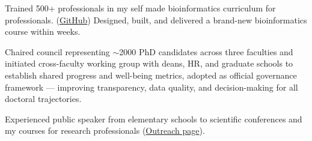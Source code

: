 \documentclass[a4paper,10pt]{article}
\begin{document}
{\begin{adjustbox}{valign=t}
\begin{minipage}[t]{0.6\textwidth}
\begin{description}
  \item Trained 500+ professionals in my self made bioinformatics curriculum for professionals. 
    (\href{https://github.com/lauralwd/professional_education}{GitHub})
  Designed, built, and delivered a brand-new bioinformatics course within weeks.%
  \item Chaired council representing $\sim$2000 PhD candidates across three faculties 
  and initiated cross-faculty working group with deans, HR, and graduate schools 
  to establish shared progress and well-being metrics, adopted as official governance framework 
  — improving transparency, data quality, and decision-making for all doctoral trajectories.
  \item Experienced public speaker from elementary schools to scientific conferences and my courses for research professionals
    (\href{https://lauralwd.github.io/outreach/}{Outreach page}).

\end{description}
\end{minipage}
\end{adjustbox}}
\end{document}
